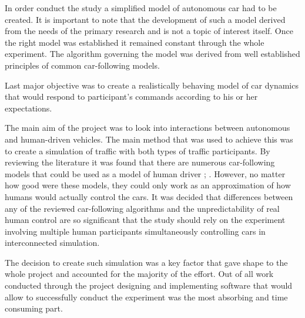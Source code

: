 \documentclass[11pt,english]{article}
\begin{document}
\par

In order conduct the study a simplified model of autonomous car had to be created. It is important to note that the development of such a model derived from the needs of the primary research and is not a topic of interest itself. Once the right model was established it remained constant through the whole experiment. The algorithm governing the model was derived from well established principles of common car-following models.


\par

Last major objective was to create a realistically behaving model of car dynamics that would respond to participant's commands according to his or her expectations. 



\par

The main aim of the project was to look into interactions between autonomous and human-driven vehicles. The main method that was used to achieve this was to create a simulation of traffic with both types of traffic participants. By reviewing the literature it was found that there are numerous car-following models that could be used as a model of human driver \citep{rothery1992car}; \citep{treiber2013traffic}. However, no matter how good were these models, they could only work as an approximation of how humans would actually control the cars. It was decided that differences between any of the reviewed car-following algorithms and the unpredictability of real human control are so significant that the study should rely on the experiment involving multiple human participants simultaneously controlling cars in interconnected simulation.
 \par
The decision to create such simulation was a key factor that gave shape to the whole project and accounted for the majority of the effort. Out of all work conducted through the project designing and implementing software that would allow to successfully conduct the experiment was the most absorbing and time consuming part.



\end{document}
